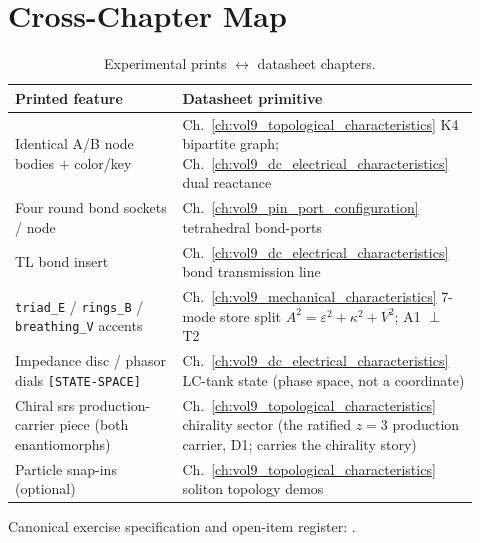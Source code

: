 \section{Cross-Chapter Map}
\label{sec:vol9_exp_prints_cross_chapter}

\begin{table}[htbp]
\centering
\caption{Experimental prints $\leftrightarrow$ datasheet chapters.}
\label{tab:vol9_exp_prints_cross_chapter}
\begin{tabular}{p{0.34\linewidth} p{0.58\linewidth}}
\toprule
\textbf{Printed feature} & \textbf{Datasheet primitive} \\
\midrule
Identical A/B node bodies $+$ color/key & Ch.~\ref{ch:vol9_topological_characteristics} K4 bipartite graph; Ch.~\ref{ch:vol9_dc_electrical_characteristics} dual reactance \\
Four round bond sockets / node & Ch.~\ref{ch:vol9_pin_port_configuration} tetrahedral bond-ports \\
TL bond insert & Ch.~\ref{ch:vol9_dc_electrical_characteristics} bond transmission line \\
\texttt{triad\_E} / \texttt{rings\_B} / \texttt{breathing\_V} accents & Ch.~\ref{ch:vol9_mechanical_characteristics} 7-mode store split $A^2=\varepsilon^2+\kappa^2+V^2$; A1 $\perp$ T2 \\
Impedance disc / phasor dials \texttt{[STATE-SPACE]} & Ch.~\ref{ch:vol9_dc_electrical_characteristics} LC-tank state (phase space, not a coordinate) \\
Chiral srs production-carrier piece (both enantiomorphs) & Ch.~\ref{ch:vol9_topological_characteristics} chirality sector (the ratified $z=3$ production carrier, D1; carries the chirality story) \\
Particle snap-ins (optional) & Ch.~\ref{ch:vol9_topological_characteristics} soliton topology demos \\
\bottomrule
\end{tabular}
\end{table}

Canonical exercise specification and open-item register: .
